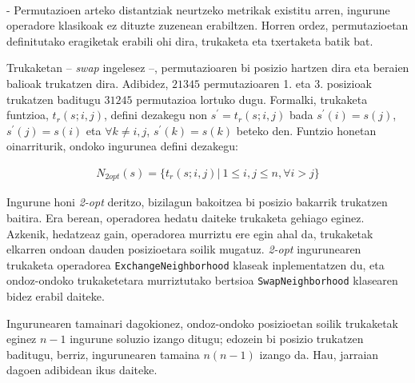 \documentclass[eu]{ifirak}\usepackage[]{graphicx}\usepackage[]{color}
\newcommand{\code}[1]{\texttt{#1}}
\begin{document}
\paragraph{}
 - Permutazioen arteko distantziak neurtzeko metrikak existitu arren, ingurune operadore klasikoak ez dituzte zuzenean erabiltzen. Horren ordez, permutazioetan definitutako eragiketak erabili ohi dira, trukaketa eta txertaketa batik bat. 

Trukaketan -- \textit{swap} ingelesez --, permutazioaren bi posizio hartzen dira eta beraien balioak trukatzen dira. Adibidez, $21345$ permutazioaren 1. eta 3. posizioak trukatzen baditugu $31245$ permutazioa lortuko dugu. Formalki, trukaketa funtzioa, $t_r(s;i,j)$, defini dezakegu non $s^\prime = t_r(s;i,j)$ bada $s^\prime(i)=s(j)$, $s^\prime(j)=s(i)$ eta $\forall k\neq i,j$, $s^\prime(k)=s(k)$ beteko den. Funtzio honetan oinarriturik, ondoko ingurunea defini dezakegu:

\begin{align}
N_{2opt}(s) = \{t_r(s;i,j)|\ 1 \leq i,j\leq n,  \forall i > j\}
\end{align}

Ingurune honi \textit{2-opt} deritzo, bizilagun bakoitzea bi posizio bakarrik trukatzen baitira. Era berean, operadorea hedatu daiteke trukaketa gehiago eginez. Azkenik, hedatzeaz gain, operadorea murriztu ere egin ahal da, trukaketak elkarren ondoan dauden posizioetara soilik mugatuz. \textit{2-opt} ingurunearen trukaketa operadorea \code{ExchangeNeighborhood} klaseak inplementatzen du, eta ondoz-ondoko trukaketetara murriztutako bertsioa \code{SwapNeighborhood} klasearen bidez erabil daiteke.

Ingurunearen tamainari dagokionez, ondoz-ondoko posizioetan soilik trukaketak eginez $n-1$ ingurune soluzio izango ditugu; edozein bi posizio trukatzen baditugu, berriz, ingurunearen tamaina $n(n-1)$ izango da. Hau, jarraian dagoen adibidean ikus daiteke.
\end{document}
